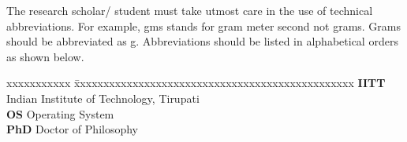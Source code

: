 \abbreviations
The research scholar/ student must take utmost care in the use of technical abbreviations. For example, gms stands for  gram meter second not grams. Grams should be abbreviated as g. Abbreviations should be listed in alphabetical orders as shown below.
\noindent 
\begin{tabbing}
xxxxxxxxxxx \= xxxxxxxxxxxxxxxxxxxxxxxxxxxxxxxxxxxxxxxxxxxxxxxx \kill
\textbf{IITT}   \> Indian Institute of Technology, Tirupati \\
\textbf{OS} \> Operating System \\
\textbf{PhD} \> Doctor of Philosophy \\
\end{tabbing}

\pagebreak